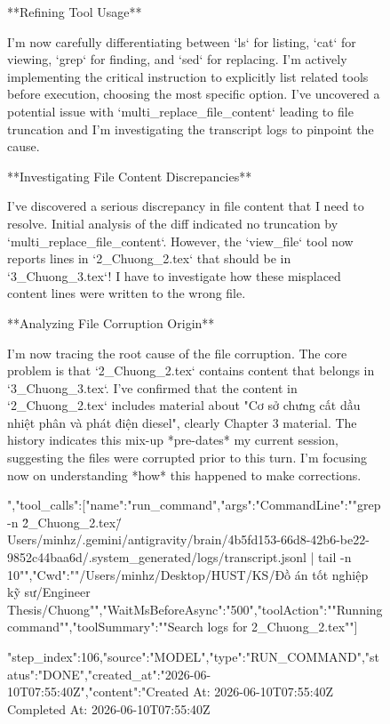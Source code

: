 \begin{figure}[htbp]
{**Refining Tool Usage**

I'm now carefully differentiating between `ls` for listing, `cat` for viewing, `grep` for finding, and `sed` for replacing. I'm actively implementing the critical instruction to explicitly list related tools before execution, choosing the most specific option. I've uncovered a potential issue with `multi_replace_file_content` leading to file truncation and I'm investigating the transcript logs to pinpoint the cause.


**Investigating File Content Discrepancies**

I've discovered a serious discrepancy in file content that I need to resolve. Initial analysis of the diff indicated no truncation by `multi_replace_file_content`. However, the `view_file` tool now reports lines in `2_Chuong_2.tex` that should be in `3_Chuong_3.tex`! I have to investigate how these misplaced content lines were written to the wrong file.


**Analyzing File Corruption Origin**

I'm now tracing the root cause of the file corruption. The core problem is that `2_Chuong_2.tex` contains content that belongs in `3_Chuong_3.tex`. I've confirmed that the content in `2_Chuong_2.tex` includes material about "Cơ sở chưng cất dầu nhiệt phân và phát điện diesel", clearly Chapter 3 material. The history indicates this mix-up *pre-dates* my current session, suggesting the files were corrupted prior to this turn. I'm focusing now on understanding *how* this happened to make corrections.


","tool_calls":[{"name":"run_command","args":{"CommandLine":""grep -n \"2_Chuong_2.tex\" /Users/minhz/.gemini/antigravity/brain/4b5fd153-66d8-42b6-be22-9852c44baa6d/.system_generated/logs/transcript.jsonl | tail -n 10"","Cwd":""/Users/minhz/Desktop/HUST/KS/Đồ án tốt nghiệp kỹ sư/Engineer Thesis/Chuong"","WaitMsBeforeAsync":"500","toolAction":""Running command"","toolSummary":""Search logs for 2_Chuong_2.tex""}}]}
{"step_index":106,"source":"MODEL","type":"RUN_COMMAND","status":"DONE","created_at":"2026-06-10T07:55:40Z","content":"Created At: 2026-06-10T07:55:40Z
Completed At: 2026-06-10T07:55:40Z

}
\end{figure}
